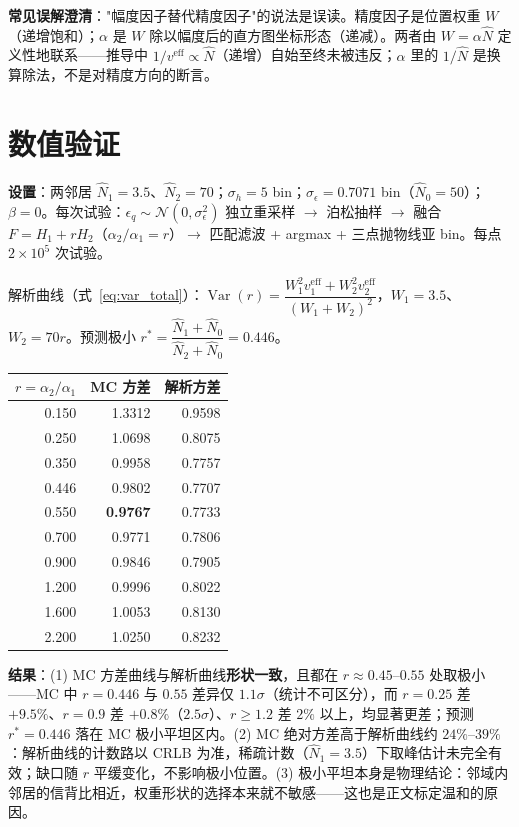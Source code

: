 \documentclass[11pt]{ctexart}
\newcommand{\Var}{\operatorname{Var}}
\begin{document}
\textbf{常见误解澄清}："幅度因子替代精度因子"的说法是误读。精度因子是位置权重 $W$（递增饱和）；$\alpha$ 是 $W$ 除以幅度后的直方图坐标形态（递减）。两者由 $W=\alpha\hat N$ 定义性地联系——推导中 $1/v^{\mathrm{eff}}\propto\hat N$（递增）自始至终未被违反；$\alpha$ 里的 $1/\hat N$ 是换算除法，不是对精度方向的断言。

\section{数值验证}

\textbf{设置}：两邻居 $\hat N_1=3.5$、$\hat N_2=70$；$\sigma_h=5$ bin；$\sigma_\epsilon=0.7071$ bin（$\hat N_0=50$）；$\beta=0$。每次试验：$\epsilon_q\sim\mathcal N(0,\sigma_\epsilon^2)$ 独立重采样 $\to$ 泊松抽样 $\to$ 融合 $F=H_1+rH_2$（$\alpha_2/\alpha_1=r$）$\to$ 匹配滤波 + argmax + 三点抛物线亚 bin。每点 $2\times10^5$ 次试验。

解析曲线（式~\eqref{eq:var_total}）：$\Var(r)=\dfrac{W_1^2v^{\mathrm{eff}}_1+W_2^2v^{\mathrm{eff}}_2}{(W_1+W_2)^2}$，$W_1=3.5$、$W_2=70r$。预测极小 $r^*=\dfrac{\hat N_1+\hat N_0}{\hat N_2+\hat N_0}=0.446$。

\begin{center}
\begin{tabular}{@{}rrr@{}}
\toprule
$r=\alpha_2/\alpha_1$ & MC 方差 & 解析方差 \\
\midrule
0.150 & 1.3312 & 0.9598 \\
0.250 & 1.0698 & 0.8075 \\
0.350 & 0.9958 & 0.7757 \\
0.446 & 0.9802 & 0.7707 \\
0.550 & \textbf{0.9767} & 0.7733 \\
0.700 & 0.9771 & 0.7806 \\
0.900 & 0.9846 & 0.7905 \\
1.200 & 0.9996 & 0.8022 \\
1.600 & 1.0053 & 0.8130 \\
2.200 & 1.0250 & 0.8232 \\
\bottomrule
\end{tabular}
\end{center}

\textbf{结果}：(1) MC 方差曲线与解析曲线\textbf{形状一致}，且都在 $r\approx0.45$--$0.55$ 处取极小——MC 中 $r=0.446$ 与 $0.55$ 差异仅 $1.1\sigma$（统计不可区分），而 $r=0.25$ 差 $+9.5\%$、$r=0.9$ 差 $+0.8\%$（$2.5\sigma$）、$r\ge1.2$ 差 $2\%$ 以上，均显著更差；预测 $r^*=0.446$ 落在 MC 极小平坦区内。(2) MC 绝对方差高于解析曲线约 $24\%$--$39\%$：解析曲线的计数路以 CRLB 为准，稀疏计数（$\hat N_1=3.5$）下取峰估计未完全有效；缺口随 $r$ 平缓变化，不影响极小位置。(3) 极小平坦本身是物理结论：邻域内邻居的信背比相近，权重形状的选择本来就不敏感——这也是正文标定温和的原因。
\end{document}
